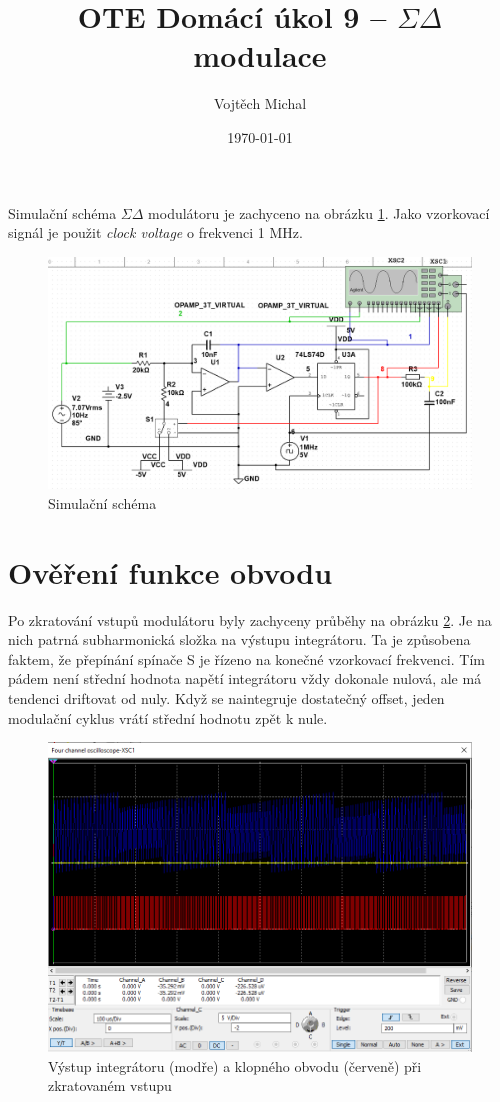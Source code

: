 \documentclass[twoside]{article}
\title{OTE Domácí úkol 9 -- $\Sigma\Delta$ modulace}
\author{Vojtěch Michal}
\date{\today}
\begin{document}
\maketitle


Simulační schéma $\Sigma\Delta$ modulátoru je
zachyceno na obrázku \ref{schema}.
Jako vzorkovací signál je použit \textit{clock voltage}
o frekvenci 1 MHz.

\begin{figure}[h]
    \includegraphics[width=\textwidth]{schema.png}
    \caption{Simulační schéma}
    \label{schema}
\end{figure}
\clearpage
\section{Ověření funkce obvodu}


Po zkratování vstupů modulátoru byly zachyceny
průběhy na obrázku \ref{zkrat-vstupu}.
Je na nich patrná subharmonická složka na výstupu integrátoru.
Ta je způsobena faktem, že přepínání spínače S je řízeno na
konečné vzorkovací frekvenci. Tím pádem není střední hodnota
napětí integrátoru vždy dokonale nulová, ale
má tendenci driftovat od nuly. Když se naintegruje dostatečný offset,
jeden modulační cyklus vrátí střední hodnotu zpět k nule.

\begin{figure}[h]
    \includegraphics[width=\textwidth]{zkratovane_vstupy_zdaleka.png}
    \caption{Výstup integrátoru (modře) a klopného obvodu (červeně) při zkratovaném vstupu}
    \label{zkrat-vstupu}
\end{figure}
\end{document}
